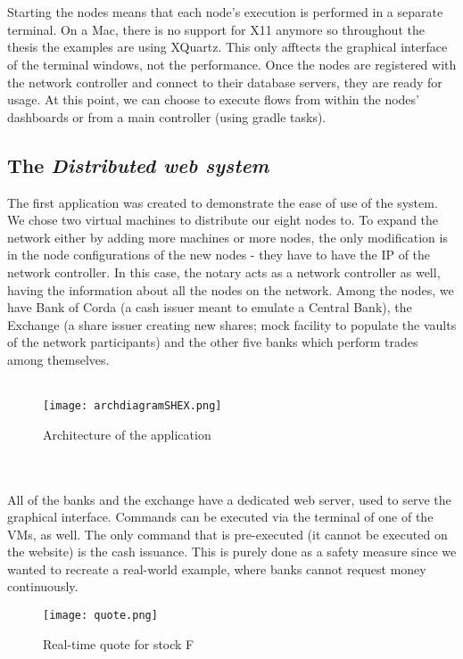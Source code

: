 \documentclass[12pt,twoside]{article}
\begin{document}
\\ \\
Starting the nodes means that each node's execution is performed in a separate terminal. On a Mac, there is no support for X11 anymore so throughout the thesis the examples are using XQuartz. This only afftects the graphical interface of the terminal windows, not the performance. Once the nodes are registered with the network controller and connect to their database servers, they are ready for usage. At this point, we can choose to execute flows from within the nodes' dashboards or from a main controller (using gradle tasks).
\subsection{The \textit{Distributed web system}}
\label{sub:sharedEX}
The first application was created to demonstrate the ease of use of the system. We chose two virtual machines to distribute our eight nodes to. To expand the network either by adding more machines or more nodes, the only modification is in the node configurations of the new nodes - they have to have the IP of the network controller. In this case, the notary acts as a network controller as well, having the information about all the nodes on the network. Among the nodes, we have Bank of Corda (a cash issuer meant to emulate a Central Bank), the Exchange (a share issuer creating new shares; mock facility to populate the vaults of the network participants) and the other five banks which perform trades among themselves.
\\ \\
\begin{figure}[!htb]
\centering
\texttt{[image: archdiagramSHEX.png]}
\caption{Architecture of the application}
\centering
\label{fig:shEx}
\end{figure}
\\ \\
All of the banks and the exchange have a dedicated web server, used to serve the graphical interface. Commands can be executed via the terminal of one of the VMs, as well. The only command that is pre-executed (it cannot be executed on the website) is the cash issuance. This is purely done as a safety measure since we wanted to recreate a real-world example, where banks cannot request money continuously. 
\\
\begin{figure}[!htb]
\centering
\texttt{[image: quote.png]}
\caption{Real-time quote for stock F}
\centering
\label{fig:quote}
\end{figure}
\end{document}
